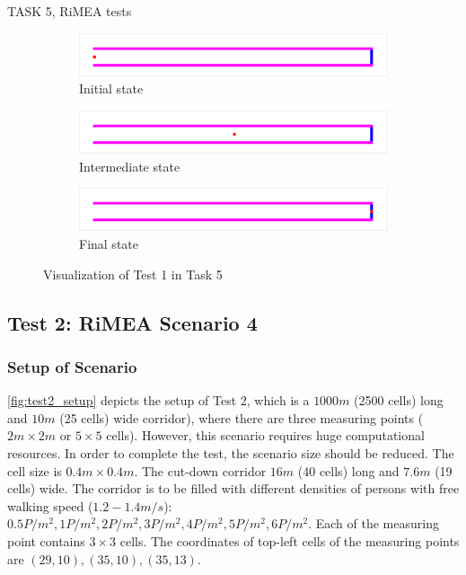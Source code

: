 \documentclass[10pt,a4paper]{article}
\begin{document}
\begin{task}{TASK 5, RiMEA tests}
\begin{figure}[htbp]
  \centering
  \begin{subfigure}[b]{0.31\textwidth}
    \includegraphics[width=\textwidth]{pictures/test1_initial.png}
    \caption{Initial state}
    \label{fig:test1_initial}
  \end{subfigure}
  \begin{subfigure}[b]{0.31\textwidth}
    \includegraphics[width=\textwidth]{pictures/test1_intermediate.png}
    \caption{Intermediate state}
    \label{fig:test1_intermediate}
  \end{subfigure}
  \begin{subfigure}[b]{0.31\textwidth}
    \includegraphics[width=\textwidth]{pictures/test1_end.png}
    \caption{Final state}
    \label{fig:test1_end}
  \end{subfigure}
  \caption{Visualization of Test 1 in Task 5}
  \label{fig:test1}
\end{figure}


\subsection{Test 2: RiMEA Scenario 4}

\subsubsection{Setup of Scenario}

\autoref{fig:test2_setup} depicts the setup of Test 2\cite{RimeaGuidelines2016}, which is a $1000m$ (2500 cells) long and $10m$ (25 cells) wide corridor), where there are three measuring points ($2m \times 2m$ or $5 \times 5$ cells). However, this scenario requires huge computational resources. In order to complete the test, the scenario size should be reduced. The cell size is $0.4m \times 0.4m$. The cut-down corridor $16m$ (40 cells) long and $7.6m$ (19 cells) wide. The corridor is to be filled with different densities of persons with free walking speed ($1.2 - 1.4m/s$): $0.5 P/m^{2}, 1 P/m^{2}, 2 P/m^{2}, 3 P/m^{2}, 4 P/m^{2}, 5 P/m^{2}, 6 P/m^{2}$. Each of the measuring point contains $3 \times 3$ cells. The coordinates of top-left cells of the measuring points are $(29, 10), (35, 10), (35, 13)$.


\end{task}
\end{document}

